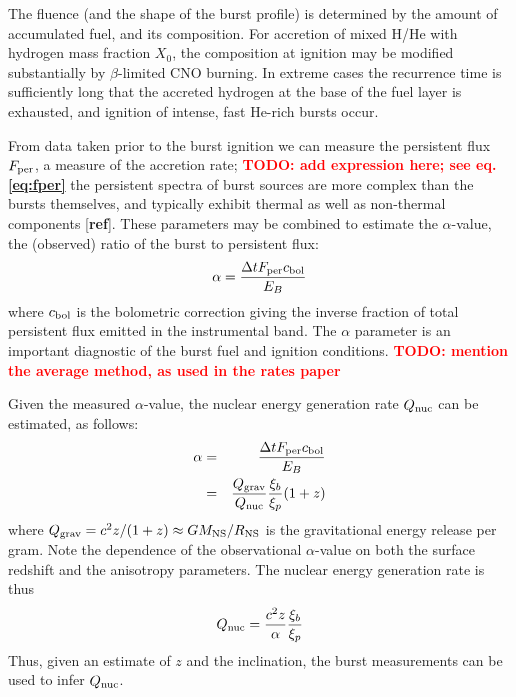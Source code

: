 \documentclass{aastex63}
\newcommand{\todo}[1]{\textbf{\textcolor{red}{TODO: #1}}} %
\begin{document}
The fluence (and the shape of the burst profile) is determined by the amount of accumulated fuel, and its composition. For accretion of mixed H/He with hydrogen mass fraction $X_0$, the composition at ignition may be modified substantially by $\beta$-limited CNO burning. In extreme cases the recurrence time is sufficiently long that the accreted hydrogen at the base of the fuel layer is exhausted, and ignition of intense, fast He-rich bursts occur.

From data taken prior to the burst ignition we can measure the persistent flux $F_{\rm per}$, a measure of the accretion rate; \todo{ add expression here; see eq. \ref{eq:fper}}
the persistent spectra of burst sources are  more complex than the bursts themselves, and typically exhibit thermal as well as non-thermal components [{\bf ref}].
%
These parameters may be combined to estimate the $\alpha$-value, the (observed) ratio of the burst to persistent flux: 
\begin{equation}
\alpha = \frac{\Delta t F_{\rm per} c_{\rm bol}}{E_B}
\end{equation}
where $c_{\rm bol}$ is the bolometric correction giving the inverse fraction of total persistent flux emitted in the instrumental band.
%
The $\alpha$ parameter is an important diagnostic of the burst fuel and ignition conditions.
%
\todo{mention the average method, as used in the rates paper }

Given the measured $\alpha$-value, the nuclear energy generation rate $Q_{\rm nuc}$ can be estimated, as follows:
\begin{eqnarray}
\alpha & = & \frac{\Delta t F_{\rm per} c_{\rm bol}}{E_B} \\
& = & \frac{Q_{\rm grav}}{Q_{\rm nuc}}\frac{\xi_b}{\xi_p}(1+z)
\end{eqnarray}
where $Q_{\rm grav} = c^2z/(1+z) \approx GM_{\rm NS}/R_{\rm NS}$ is the gravitational energy release per gram. Note the dependence of the observational $\alpha$-value on both the surface redshift and the anisotropy parameters. The nuclear energy generation rate is thus
\begin{equation}
Q_{\rm nuc} = \frac{c^2 z}{\alpha}\frac{\xi_b}{\xi_p} \label{qnuc}
\end{equation}
Thus, given an estimate of $z$ and the inclination, the burst measurements can be used to infer $Q_{\rm nuc}$. 
\end{document}
